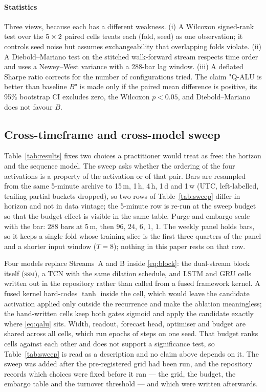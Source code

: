 \documentclass[conference]{IEEEtran}
\begin{document}
\paragraph{Statistics}
Three views, because each has a different weakness. (i) A Wilcoxon signed-rank
test over the $5{}\times2{}$ paired cells treats each (fold, seed) as one
observation; it controls seed noise but assumes exchangeability that
overlapping folds violate. (ii) A Diebold--Mariano test on the stitched
walk-forward stream respects time order and uses a Newey--West variance with a
288-bar lag window. (iii) A deflated Sharpe ratio corrects for the number of
configurations tried. The claim "Q-ALU is better than baseline $B$" is made
only if the paired mean difference is positive, its 95\% bootstrap CI excludes
zero, the Wilcoxon $p<0.05$, and Diebold--Mariano does not favour $B$.

\subsection{Cross-timeframe and cross-model sweep}
\label{sec:sweep}
Table~\ref{tab:results} fixes two choices a practitioner would treat as free:
the horizon and the sequence model. The sweep asks whether the ordering of the
four activations is a property of the activation or of that pair. Bars are
resampled from the same 5-minute archive to 15\,m, 1\,h, 4\,h, 1\,d and 1\,w
(UTC, left-labelled, trailing partial buckets dropped), so two rows of
Table~\ref{tab:sweep} differ in horizon and not in data vintage; the 5-minute row
is re-run at the sweep budget so that the budget effect is visible in the same
table. Purge and embargo scale with the bar: $288$ bars at 5\,m, then $96$,
$24$, $6$, $1$, $1$. The weekly panel holds \sweepBarsOneW{} bars, so it keeps a
single fold whose training slice is the first three quarters of the panel and a
shorter input window ($T=8$); nothing in this paper rests on that row.

Four models replace Streams~A and B inside \eqref{eq:block}: the dual-stream
block itself (\textsc{ssm}), a TCN with the same dilation schedule, and LSTM and
GRU cells written out in the repository rather than called from a fused
framework kernel. A fused kernel hard-codes $\tanh$ inside the cell, which would
leave the candidate activation applied only outside the recurrence and make the
ablation meaningless; the hand-written cells keep both gates sigmoid and apply
the candidate exactly where \eqref{eq:qalu} sits. Width, readout, forecast head,
optimiser and budget are shared across all \sweepCells{} cells, which run
\sweepEpochs{} epochs of \sweepSteps{} steps on one seed. That budget ranks cells
against each other and does not support a significance test, so
Table~\ref{tab:sweep} is read as a description and no claim above depends on it.
The sweep was added after the pre-registered grid had been run, and the
repository records which choices were fixed before it ran --- the grid, the
budget, the embargo table and the turnover threshold --- and which were written
afterwards.
\end{document}
